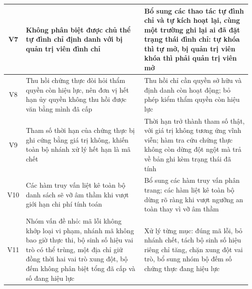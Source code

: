 \begin{longtable}{|c|p{4.1cm}|p{8.3cm}|}
V7 & Không phân biệt được chủ thể tự đình chỉ định danh với bị quản trị viên đình chỉ
& Bổ sung các thao tác tự đình chỉ và tự kích hoạt lại, cùng một trường ghi lại ai đã đặt trạng thái đình chỉ: tự khóa thì tự mở, bị quản trị viên khóa thì phải quản trị viên mở
\\ \hline

V8 & Thu hồi chứng thực đòi hỏi thẩm quyền còn hiệu lực, nên đơn vị hết hạn ủy quyền không thu hồi được văn bằng mình đã cấp
& Thu hồi chỉ cần quyền sở hữu và định danh còn hoạt động; bỏ phép kiểm thẩm quyền còn hiệu lực
\\ \hline

V9 & Tham số thời hạn của chứng thực bị ghi cứng bằng giá trị không, khiến toàn bộ nhánh xử lý hết hạn là mã chết
& Thời hạn trở thành tham số thật, với giá trị không tương ứng vĩnh viễn; hàm tra cứu chứng thực không còn dừng đột ngột mà trả về bản ghi kèm trạng thái đã tính
\\ \hline

V10 & Các hàm truy vấn liệt kê toàn bộ danh sách sẽ vỡ âm thầm khi vượt giới hạn chi phí tính toán
& Bổ sung các hàm truy vấn phân trang; các hàm liệt kê toàn bộ dừng rõ ràng khi vượt ngưỡng an toàn thay vì vỡ âm thầm
\\ \hline

V11 & Nhóm vấn đề nhỏ: mã lỗi không khớp loại vi phạm, nhánh mã không bao giờ thực thi, bộ sinh số hiệu vai trò có thể trùng, một địa chỉ giữ đồng thời hai vai trò xung đột, bộ đếm không phân biệt tổng đã cấp và số đang hiệu lực
& Xử lý từng mục: đúng mã lỗi, bỏ nhánh chết, tách bộ sinh số hiệu riêng chỉ tăng, chặn xung đột vai trò, bổ sung nhóm bộ đếm số chứng thực đang hiệu lực
\\ \hline

\end{longtable}
